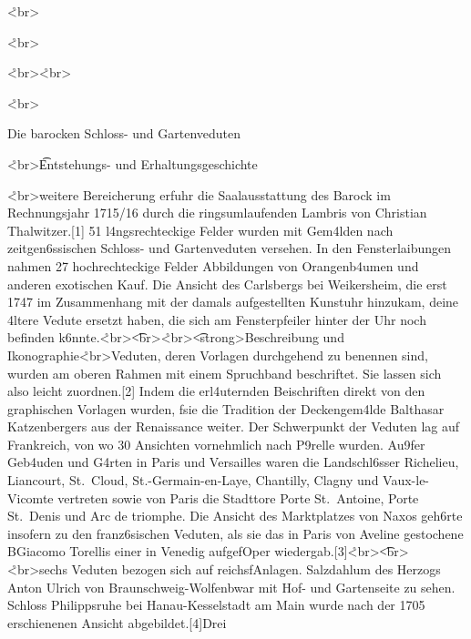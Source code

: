 \documentclass[
  a4paper,
]{book}
\begin{document}
\r<br\textgreater{}

\r<br\textgreater{}

\r<br\textgreater{}\r<br\textgreater{}

\r<br\textgreater{}

Die barocken Schloss- und Gartenveduten

\r<br\textgreater{}\t<h6>Entstehungs- und Erhaltungsgeschichte

\r<br\textgreater{}\tEine weitere Bereicherung erfuhr die
Saalausstattung des Barock im Rechnungsjahr 1715/16 durch die
ringsumlaufenden Lambris von Christian Thalwitzer.{[}1{]} 51
l\xa4ngsrechteckige Felder wurden mit Gem\xa4lden nach
zeitgen\xb6ssischen Schloss- und Gartenveduten versehen. In den
Fensterlaibungen nahmen 27 hochrechteckige Felder Abbildungen von
Orangenb\xa4umen und anderen exotischen K\xbcbelpflanzen auf.
Die Ansicht des Carlsbergs bei Weikersheim, die erst 1747 im
Zusammenhang mit der damals aufgestellten Kunstuhr hinzukam,
d\xbcrfte eine \xa4ltere Vedute ersetzt haben, die sich am
Fensterpfeiler hinter der Uhr noch befinden
k\xb6nnte.\r<br\textgreater{}\t<br\textgreater{}\r<br\textgreater{}\t<strong\textgreater Beschreibung
und Ikonographie\r<br\textgreater{}\tDie Veduten, deren Vorlagen
durchgehend zu benennen sind, wurden am oberen Rahmen mit einem
Spruchband beschriftet. Sie lassen sich also leicht zuordnen.{[}2{]}
Indem die erl\xa4uternden Beischriften direkt von den graphischen
Vorlagen \xbcbernommen wurden, f\xbchrten sie die Tradition der
Deckengem\xa4lde Balthasar Katzenbergers aus der Renaissance weiter.
Der Schwerpunkt der Veduten lag auf Frankreich, von wo 30 Ansichten
vornehmlich nach P\xa9relle \xbcbernommen wurden. Au\x9fer
Geb\xa4uden und G\xa4rten in Paris und Versailles waren die
Landschl\xb6sser Richelieu, Liancourt, St.~Cloud,
St.-Germain-en-Laye, Chantilly, Clagny und Vaux-le-Vicomte vertreten
sowie von Paris die Stadttore Porte St.~Antoine, Porte St.~Denis und Arc
de triomphe. Die Ansicht des Marktplatzes von Naxos geh\xb6rte
insofern zu den franz\xb6sischen Veduten, als sie das in Paris von
Aveline gestochene B\xbchnenbild Giacomo Torellis einer in Venedig
aufgef\xbchrten Oper
wiedergab.{[}3{]}\r<br\textgreater{}\t<br\textgreater{}\r<br\textgreater{}\tLediglich sechs
Veduten bezogen sich auf reichsf\xbcrstliche Anlagen. Salzdahlum des
Herzogs Anton Ulrich von Braunschweig-Wolfenb\xbcttel war mit Hof-
und Gartenseite zu sehen. Schloss Philippsruhe bei Hanau-Kesselstadt am
Main wurde nach der 1705 erschienenen Ansicht abgebildet.{[}4{]}Drei
\end{document}
